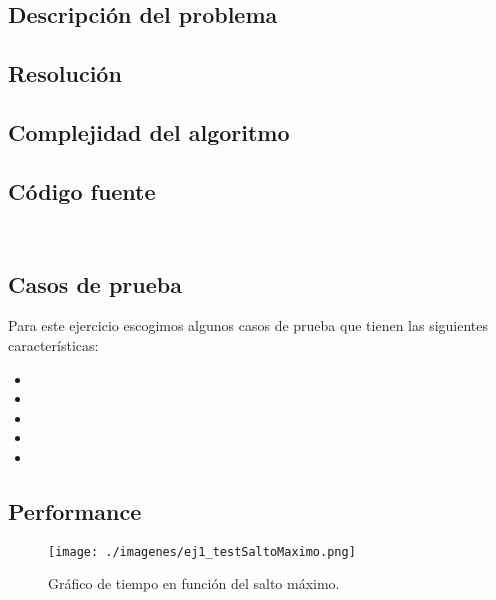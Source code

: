 \subsection{Descripci\'on del problema}



\subsection{Resoluci\'on}





\subsection{Complejidad del algoritmo}


\subsection{C\'odigo fuente}

\begin{lstlisting}


\end{lstlisting}

\subsection{Casos de prueba}

Para este ejercicio escogimos algunos casos de prueba que tienen las siguientes características:

\begin{itemize}

\item 
\item 
\item 
\item 
\item 

\end{itemize}


\subsection{Performance}



\begin{figure}[H]
\begin{center}
\texttt{[image: ./imagenes/ej1\_testSaltoMaximo.png]}
\caption{Gr\'afico de tiempo en funci\'on del salto m\'aximo.}
\end{center}
\end{figure}

